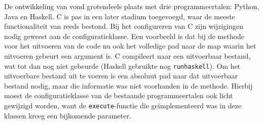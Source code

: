 De ontwikkeling van \tested{} vond grotendeels plaats met drie programmeertalen: Python, Java en Haskell.
C is pas in een later stadium toegevoegd, waar de meeste functionaliteit van \tested{} reeds bestond.
Bij het configureren van C zijn wijzigingen nodig geweest aan de configuratieklasse.
Een voorbeeld is dat bij de methode voor het uitvoeren van de code nu ook het volledige pad naar de map waarin het uitvoeren gebeurt een argument is.
C compileert naar een uitvoerbaar bestand, wat tot dan nog niet gebeurde (Haskell gebruikte nog \texttt{runhaskell}).
Om het uitvoerbare bestand uit te voeren is een absoluut pad naar dat uitvoerbaar bestand nodig, maar die informatie was niet voorhanden in de methode.
Hierbij moest de configuratieklasse van de bestaande programmeertalen ook licht gewijzigd worden, want de \texttt{execute}-functie die geïmplementeerd was in deze klassen kreeg een bijkomende parameter.
